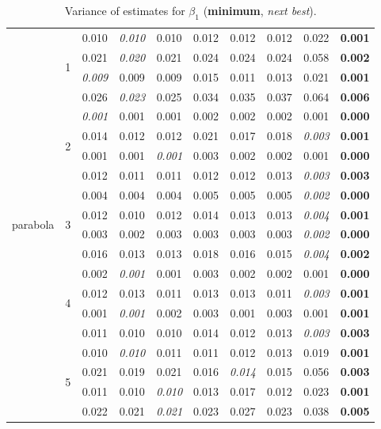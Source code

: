 \documentclass[authoryear, review, 11pt]{elsarticle}
\begin{document}
\begin{table}
\begin{center}
{\begin{tabular}{cccccccccc}
  \multirow{20}{*}{parabola} & \multirow{4}{*}{1} & 0.010 & \emph{0.010} & 0.010 & 0.012 & 0.012 & 0.012 & 0.022 & \textbf{0.001} \\ 
  &  & 0.021 & \emph{0.020} & 0.021 & 0.024 & 0.024 & 0.024 & 0.058 & \textbf{0.002} \\ 
  &  & \emph{0.009} & 0.009 & 0.009 & 0.015 & 0.011 & 0.013 & 0.021 & \textbf{0.001} \\ 
  &  & 0.026 & \emph{0.023} & 0.025 & 0.034 & 0.035 & 0.037 & 0.064 & \textbf{0.006} \\ 
  \cline{3-10}
  & \multirow{4}{*}{2} & \emph{0.001} & 0.001 & 0.001 & 0.002 & 0.002 & 0.002 & 0.001 & \textbf{0.000} \\ 
  &  & 0.014 & 0.012 & 0.012 & 0.021 & 0.017 & 0.018 & \emph{0.003} & \textbf{0.001} \\ 
  &  & 0.001 & 0.001 & \emph{0.001} & 0.003 & 0.002 & 0.002 & 0.001 & \textbf{0.000} \\ 
  &  & 0.012 & 0.011 & 0.011 & 0.012 & 0.012 & 0.013 & \emph{0.003} & \textbf{0.003} \\ 
  \cline{3-10}
  & \multirow{4}{*}{3} & 0.004 & 0.004 & 0.004 & 0.005 & 0.005 & 0.005 & \emph{0.002} & \textbf{0.000} \\ 
  &  & 0.012 & 0.010 & 0.012 & 0.014 & 0.013 & 0.013 & \emph{0.004} & \textbf{0.001} \\ 
  &  & 0.003 & 0.002 & 0.003 & 0.003 & 0.003 & 0.003 & \emph{0.002} & \textbf{0.000} \\ 
  &  & 0.016 & 0.013 & 0.013 & 0.018 & 0.016 & 0.015 & \emph{0.004} & \textbf{0.002} \\ 
  \cline{3-10}
  & \multirow{4}{*}{4} & 0.002 & \emph{0.001} & 0.001 & 0.003 & 0.002 & 0.002 & 0.001 & \textbf{0.000} \\ 
  &  & 0.012 & 0.013 & 0.011 & 0.013 & 0.013 & 0.011 & \emph{0.003} & \textbf{0.001} \\ 
  &  & 0.001 & \emph{0.001} & 0.002 & 0.003 & 0.001 & 0.003 & 0.001 & \textbf{0.001} \\ 
  &  & 0.011 & 0.010 & 0.010 & 0.014 & 0.012 & 0.013 & \emph{0.003} & \textbf{0.003} \\ 
  \cline{3-10}
  & \multirow{4}{*}{5} & 0.010 & \emph{0.010} & 0.011 & 0.011 & 0.012 & 0.013 & 0.019 & \textbf{0.001} \\ 
  &  & 0.021 & 0.019 & 0.021 & 0.016 & \emph{0.014} & 0.015 & 0.056 & \textbf{0.003} \\ 
  &  & 0.011 & 0.010 & \emph{0.010} & 0.013 & 0.017 & 0.012 & 0.023 & \textbf{0.001} \\ 
  &  & 0.022 & 0.021 & \emph{0.021} & 0.023 & 0.027 & 0.023 & 0.038 & \textbf{0.005} \\   
\end{tabular}}
\caption{Variance of estimates for $\beta_1$ (\textbf{minimum}, \emph{next best}).\label{table:X1-varx}}
\end{center}
\end{table}
\end{document}
